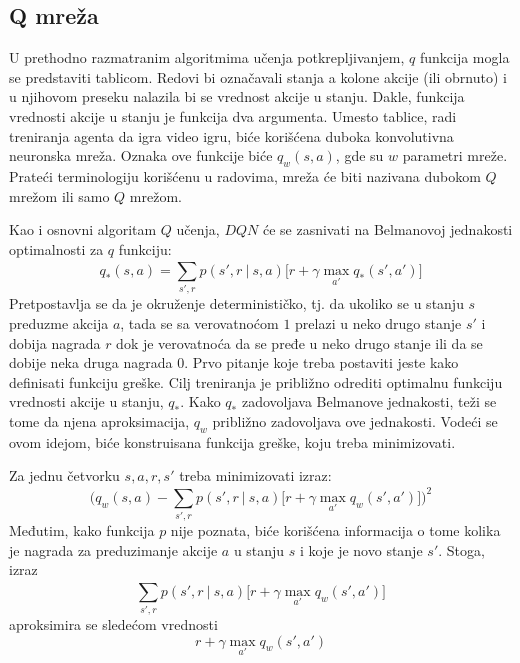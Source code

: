 \subsection{Q mreža}
U prethodno razmatranim algoritmima učenja potkrepljivanjem, $q$ funkcija mogla se predstaviti tablicom. Redovi bi označavali stanja a kolone akcije (ili obrnuto) i u njihovom preseku nalazila bi se vrednost akcije u stanju. Dakle, funkcija vrednosti akcije u stanju je funkcija dva argumenta. Umesto tablice, radi treniranja agenta da igra video igru, biće korišćena duboka konvolutivna neuronska mreža. Oznaka ove funkcije biće $q_w(s,a)$, gde su $w$ parametri mreže. Prateći terminologiju korišćenu u radovima, mreža će biti nazivana dubokom $Q$ mrežom ili samo $Q$ mrežom.
\par 
Kao i osnovni algoritam $Q$ učenja, $DQN$ će se zasnivati na Belmanovoj jednakosti optimalnosti za $q$ funkciju:
\begin{equation}
	q_*(s,a) = \sum_{s', r}^{} p(s', r~|~s,a)\big[r + \gamma \max_{a'}q_*(s',a')\big]
\end{equation}
Pretpostavlja se da je okruženje determinističko, tj. da ukoliko se u stanju $s$ preduzme akcija $a$, tada se sa verovatnoćom $1$ prelazi u neko drugo stanje $s'$  i dobija nagrada $r$ dok je verovatnoća da se pređe u neko drugo stanje ili da se dobije neka druga nagrada $0$.  Prvo pitanje koje treba postaviti jeste kako definisati funkciju greške. Cilj treniranja je približno odrediti optimalnu funkciju vrednosti akcije u stanju, $q_*$. Kako $q_*$ zadovoljava Belmanove jednakosti, teži se tome da njena aproksimacija, $q_w$ približno zadovoljava ove jednakosti. Vodeći se ovom idejom, biće konstruisana funkcija greške, koju treba minimizovati. 
\par 
Za jednu četvorku $s, a, r, s'$ treba minimizovati izraz:
\begin{equation}
	\bigg(q_w(s,a) - \sum_{s', r}^{} p(s', r~|~s,a)\big[r + \gamma \max_{a'}q_w(s',a')\big] \bigg) ^ 2
\end{equation}
Međutim, kako funkcija $p$ nije poznata, biće korišćena informacija o tome kolika je nagrada za preduzimanje akcije $a$ u stanju $s$ i koje je novo stanje $s'$. Stoga, izraz
\begin{equation}
	\sum_{s', r}^{} p(s', r~|~s,a)\big[r + \gamma \max_{a'}q_w(s',a')\big]
\end{equation}
aproksimira se sledećom vrednosti
\begin{equation}
	r + \gamma \max_{a'}q_w(s',a')
\end{equation}
